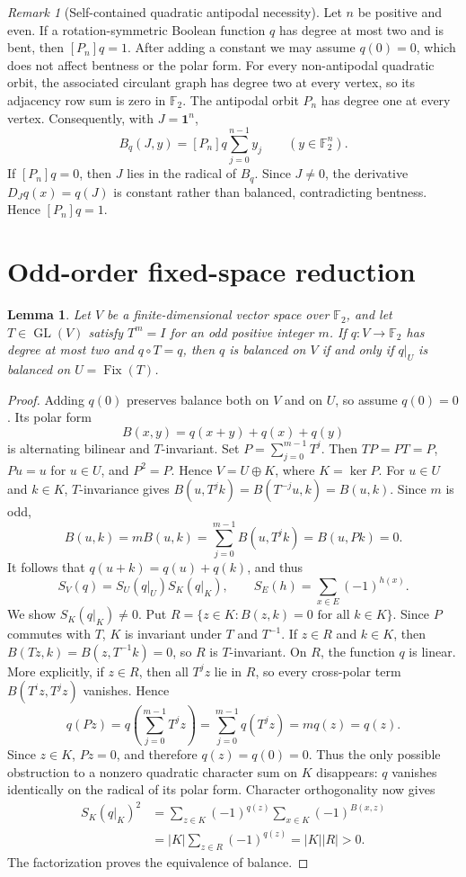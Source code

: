 \documentclass[11pt,a4paper]{article}
\newtheorem{lemma}[theorem]{Lemma}
\theoremstyle{remark}
\newtheorem{remark}[theorem]{Remark}
\theoremstyle{plain}
\newcommand{\F}{\mathbb F_2}
\newcommand{\Fix}{\operatorname{Fix}}
\begin{document}
\begin{remark}[Self-contained quadratic antipodal necessity]\label{rem:quadratic-antipodal}
Let $n$ be positive and even. If a rotation-symmetric Boolean function $q$ has degree at most two and is bent, then $[P_n]q=1$. After adding a constant we may assume $q(0)=0$, which does not affect bentness or the polar form. For every non-antipodal quadratic orbit, the associated circulant graph has degree two at every vertex, so its adjacency row sum is zero in $\F$. The antipodal orbit $P_n$ has degree one at every vertex. Consequently, with $J=\mathbf1^n$,
\[
B_q(J,y)=[P_n]q\sum_{j=0}^{n-1}y_j
\qquad (y\in\F^n).
\]
If $[P_n]q=0$, then $J$ lies in the radical of $B_q$. Since $J\ne0$, the derivative $D_Jq(x)=q(J)$ is constant rather than balanced, contradicting bentness. Hence $[P_n]q=1$.
\end{remark}

\section{Odd-order fixed-space reduction}
\begin{lemma}\label{lem:reduction}
Let $V$ be a finite-dimensional vector space over $\F$, and let $T\in\operatorname{GL}(V)$ satisfy $T^m=I$ for an odd positive integer $m$. If $q:V\to\F$ has degree at most two and $q\circ T=q$, then $q$ is balanced on $V$ if and only if $q|_U$ is balanced on $U=\Fix(T)$.
\end{lemma}
\begin{proof}
Adding $q(0)$ preserves balance both on $V$ and on $U$, so assume $q(0)=0$. Its polar form
\[B(x,y)=q(x+y)+q(x)+q(y)\]
is alternating bilinear and $T$-invariant. Set $P=\sum_{j=0}^{m-1}T^j$. Then $TP=PT=P$, $Pu=u$ for $u\in U$, and $P^2=P$. Hence $V=U\oplus K$, where $K=\ker P$. For $u\in U$ and $k\in K$, $T$-invariance gives $B(u,T^jk)=B(T^{-j}u,k)=B(u,k)$. Since $m$ is odd,
\[
B(u,k)=mB(u,k)=\sum_{j=0}^{m-1}B(u,T^jk)=B(u,Pk)=0.
\]
It follows that $q(u+k)=q(u)+q(k)$, and thus
\[S_V(q)=S_U(q|_U)S_K(q|_K),\qquad S_E(h)=\sum_{x\in E}(-1)^{h(x)}.\]
We show $S_K(q|_K)\ne0$. Put $R=\{z\in K:B(z,k)=0\text{ for all }k\in K\}$. Since $P$ commutes with $T$, $K$ is invariant under $T$ and $T^{-1}$. If $z\in R$ and $k\in K$, then $B(Tz,k)=B(z,T^{-1}k)=0$, so $R$ is $T$-invariant. On $R$, the function $q$ is linear. More explicitly, if $z\in R$, then all $T^jz$ lie in $R$, so every cross-polar term $B(T^iz,T^jz)$ vanishes. Hence
\[
q(Pz)=q\!\left(\sum_{j=0}^{m-1}T^jz\right)
     =\sum_{j=0}^{m-1}q(T^jz)
     =m q(z)=q(z).
\]
Since $z\in K$, $Pz=0$, and therefore $q(z)=q(0)=0$.
Thus the only possible obstruction to a nonzero quadratic character sum on $K$ disappears: $q$ vanishes identically on the radical of its polar form. Character orthogonality now gives
\begin{align*}
 S_K(q|_K)^2
 &=\sum_{z\in K}(-1)^{q(z)}\sum_{x\in K}(-1)^{B(x,z)}\\
 &=|K|\sum_{z\in R}(-1)^{q(z)}=|K||R|>0.
\end{align*}
The factorization proves the equivalence of balance.
\end{proof}
\end{document}
